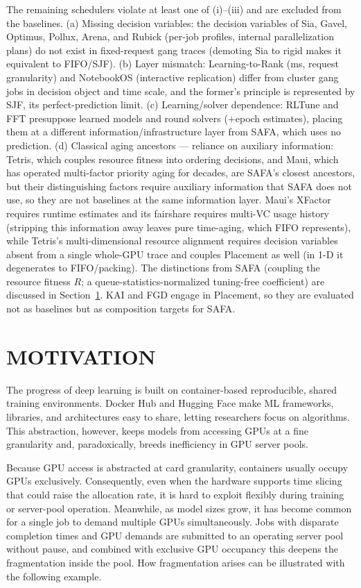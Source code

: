 \documentclass{ieeetj}
\begin{document}
The remaining schedulers violate at least one of (i)--(iii) and are excluded from the baselines. (a) Missing decision variables: the decision variables of Sia, Gavel\cite{narayanan2020gavel}, Optimus, Pollux, Arena, and Rubick (per-job profiles, internal parallelization plans) do not exist in fixed-request gang traces (demoting Sia to rigid makes it equivalent to FIFO/SJF). (b) Layer mismatch: Learning-to-Rank (ms, request granularity) and NotebookOS (interactive replication) differ from cluster gang jobs in decision object and time scale, and the former's principle is represented by SJF, its perfect-prediction limit. (c) Learning/solver dependence: RLTune and FFT presuppose learned models and round solvers ($+$epoch estimates), placing them at a different information/infrastructure layer from SAFA, which uses no prediction. (d) Classical aging ancestors --- reliance on auxiliary information: Tetris\cite{grandl2014multi}, which couples resource fitness into ordering decisions, and Maui\cite{jackson2001maui}, which has operated multi-factor priority aging for decades, are SAFA's closest ancestors, but their distinguishing factors require auxiliary information that SAFA does not use, so they are not baselines at the same information layer. Maui's XFactor requires runtime estimates and its fairshare requires multi-VC usage history (stripping this information away leaves pure time-aging, which FIFO represents), while Tetris's multi-dimensional resource alignment requires decision variables absent from a single whole-GPU trace and couples Placement as well (in 1-D it degenerates to FIFO/packing). The distinctions from SAFA (coupling the resource fitness $R$; a queue-statistics-normalized tuning-free coefficient) are discussed in Section~\ref{motivation}. KAI and FGD engage in Placement, so they are evaluated not as baselines but as composition targets for SAFA.


\section{MOTIVATION}\label{motivation}
The progress of deep learning is built on container-based\cite{b7} reproducible, shared training environments. Docker Hub\cite{b8} and Hugging Face\cite{b9} make ML frameworks, libraries, and architectures easy to share, letting researchers focus on algorithms. This abstraction, however, keeps models from accessing GPUs at a fine granularity and, paradoxically, breeds inefficiency in GPU server pools.

Because GPU access is abstracted at card granularity, containers usually occupy GPUs exclusively. Consequently, even when the hardware supports time slicing that could raise the allocation rate, it is hard to exploit flexibly during training or server-pool operation. Meanwhile, as model sizes grow, it has become common for a single job to demand multiple GPUs simultaneously. Jobs with disparate completion times and GPU demands are submitted to an operating server pool without pause, and combined with exclusive GPU occupancy this deepens the fragmentation inside the pool. How fragmentation arises can be illustrated with the following example.
\end{document}

